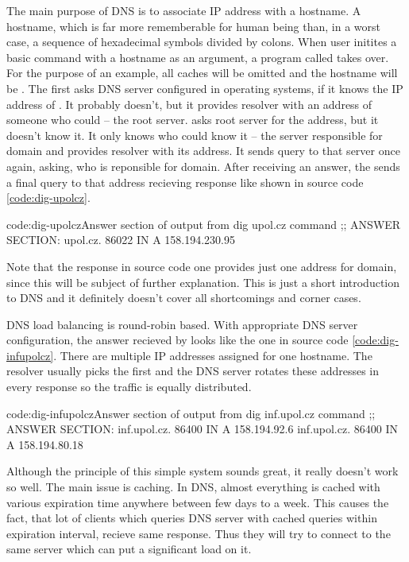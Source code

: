 \documentclass[
  master,
  biblatex,
  glossaries,
  index
]{kidiplom}
\begin{document}
The main purpose of DNS is to associate IP address with a hostname. A hostname, which is far more rememberable for human being than, in a worst case, a sequence of hexadecimal symbols divided by colons. When user initites a basic command  with a hostname as an argument, a program called  takes over. For the purpose of an example, all caches will be omitted and the hostname will be . The  first asks DNS server configured in operating systems, if it knows the IP address of . It probably doesn't, but it provides resolver with an address of someone who could -- the root server.  asks root server for the address, but it doesn't know it. It only knows who could know it -- the server responsible for  domain and provides resolver with its address. It sends query to that server once again, asking, who is reponsible for  domain. After receiving an answer, the  sends a final query to that address recieving response like shown in source code \ref{code:dig-upolcz}.

\begin{kicode}{}{code:dig-upolcz}{Answer section of output from dig upol.cz command}
;; ANSWER SECTION:
upol.cz.		86022	IN	A	158.194.230.95
\end{kicode}

Note that the response in source code one provides just one address for  domain, since this will be subject of further explanation. This is just a short introduction to DNS and it definitely doesn't cover all shortcomings and corner cases.

DNS load balancing is round-robin based. With appropriate DNS server configuration, the answer recieved by  looks like the one in source code \ref{code:dig-infupolcz}. There are multiple IP addresses assigned for one hostname. The resolver usually picks the first and the DNS server rotates these addresses in every response so the traffic is equally distributed.

\begin{kicode}{}{code:dig-infupolcz}{Answer section of output from dig inf.upol.cz command}
;; ANSWER SECTION:
inf.upol.cz.		86400	IN	A	158.194.92.6
inf.upol.cz.		86400	IN	A	158.194.80.18
\end{kicode}

Although the principle of this simple system sounds great, it really doesn't work so well. The main issue is caching. In DNS, almost everything is cached with various expiration time anywhere between few days to a week. This causes the fact, that lot of clients which queries DNS server with cached queries within expiration interval, recieve same response. Thus they will try to connect to the same server which can put a significant load on it.
\end{document}

